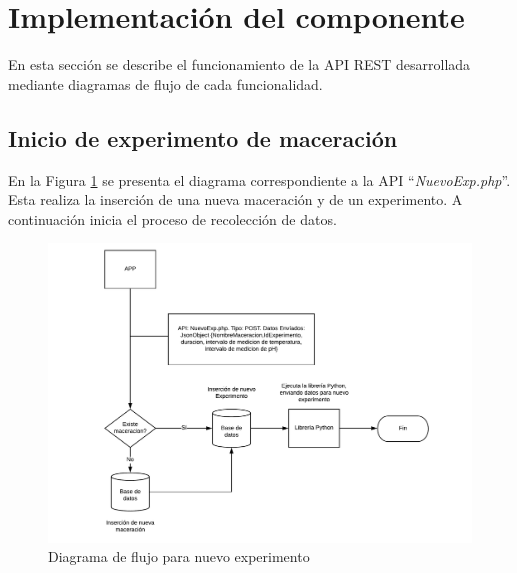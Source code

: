     \section{Implementación del componente}
        \par En esta sección se describe el funcionamiento de la API REST desarrollada mediante diagramas de flujo de cada funcionalidad.
        
        \subsection{Inicio de experimento de maceración}
        \par En la Figura \ref{fig:ApiNuevoExp} se presenta el diagrama correspondiente a la API ``\textit{NuevoExp.php}''. Esta realiza la inserción de una nueva maceración y de un experimento. A continuación inicia el proceso de recolección de datos.
            \begin{figure} [h]
                \centering
                \includegraphics[scale=0.58]{Interfaz_Hard-Soft/DiagramaNuevoExp.pdf}
                \caption{Diagrama de flujo para nuevo experimento}
                \label{fig:ApiNuevoExp}
            \end{figure}
            
